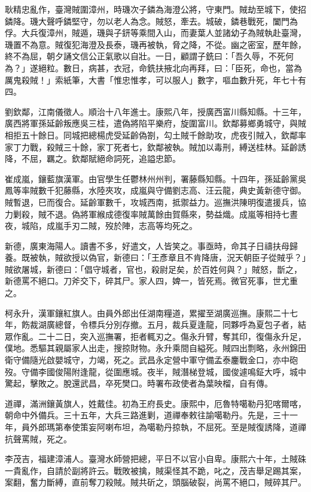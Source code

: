 \begin{pinyinscope}
耿精忠亂作，臺灣賊圍漳州，時璣次子鏻為海澄公將，守東門。賊劫至城下，使招鏻降。璣大聲呼鏻堅守，勿以老人為念。賊怒，牽去。城破，鏻巷戰死，闔門為俘。大兵復漳州，賊遁，璣與子鈃等乘間入山，而妻葉人並諸幼子為賊執赴臺灣，璣置不為意。賊復犯海澄及長泰，璣再被執，脅之降，不從。幽之密室，歷年餘，終不為屈，朝夕誦文信公正氣歌以自壯。一日，顧謂子銑曰：「吾久辱，不死何為？」遂絕粒。數日，病甚，衣冠，命銑扶掖北向再拜，曰：「臣死，命也，當為厲鬼殺賊！」索紙筆，大書「惟忠惟孝，可以服人」數字，嘔血數升死，年七十有四。

劉欽鄰，江南儀徵人。順治十八年進士。康熙八年，授廣西富川縣知縣。十三年，廣西將軍孫延齡叛應吳三桂，遣偽將陷平樂府，旋圍富川。欽鄰募鄉勇城守，與賊相拒五十餘日。同城把總楊虎受延齡偽劄，勾土賊千餘助攻，虎夜引賊入，欽鄰率家丁力戰，殺賊三十餘，家丁死者七，欽鄰被執。賊加以毒刑，縛送桂林。延齡誘降，不屈，羈之。欽鄰賦絕命詞死，追謚忠節。

崔成嵐，鑲藍旗漢軍。由官學生任鬱林州州判，署藤縣知縣。十四年，孫延齡黨吳鳳等率賊數千犯藤縣，水陸夾攻，成嵐與守備劉志高、汪云龍，典史黃新德守御。賊暫退，巳而復合。延齡軍數千，攻城西南，抵禦益力。巡撫洪陳明復遣援兵，協力剿殺，賊不退。偽將軍緱成德復率賊萬餘由賀縣來，勢益熾。成嵐等相持七晝夜，城陷，成嵐手刃二賊，歿於陣，志高等均死之。

新德，廣東海陽人。讀書不多，好遣文，人皆笑之。事亟時，命其子日禱扶母歸養。既被執，賊欲授以偽官，新德曰：「王彥章且不肯降唐，況天朝臣子從賊乎？」賊欲屠城，新德曰：「倡守城者，官也，殺尉足矣，於百姓何與？」賊怒，斮之，新德罵不絕口。刀斧交下，碎其尸。家人四，婢一，皆死焉。微官死事，世尤重之。

柯永升，漢軍鑲紅旗人。由員外郎出任湖南糧道，累擢至湖廣巡撫。康熙二十七年，飭裁湖廣總督，令標兵分別存撤。五月，裁兵夏逢龍，同夥呼為夏包子者，結眾作亂。二十二日，突入巡撫署，拒者輒刃之。傷永升臂，奪其印，復傷永升足，僕地。悉驅其親屬家人出走，搜掠財物。永升乘間自縊死。賊四出剽略，永州錦田衛守備隨光啟嬰城守，力竭，死之。武昌永定營中軍守備孟泰鏖戰金口，亦中砲歿。守備李國俊陽附逢龍，從圍應城。夜半，賊潛梯登城，國俊遽鳴鉦大呼，城中驚起，擊敗之。脫還武昌，卒死樊口。時署布政使者為葉映榴，自有傳。

道禪，滿洲鑲黃旗人，姓戴佳。初為王府長史。康熙中，厄魯特噶勒丹犯喀爾喀，朝命中外備兵。三十五年，大兵三路進剿，道禪奉敕往諭噶勒丹。先是，三十一年，員外郎瑪第奉使策妄阿喇布坦，為噶勒丹掠執，不屈死。至是賊復誘降，道禪抗聲罵賊，死之。

李茂吉，福建漳浦人。臺灣水師營把總，平日不以官小自卑。康熙六十年，土賊硃一貴亂作，自請於副將許云。戰敗被擒，賊渠怪其不跪，叱之，茂吉舉足踢其案，案翻，奮力斷縛，直前奪刀殺賊。賊共斫之，頭腦破裂，尚罵不絕口，賊碎其尸。


\end{pinyinscope}
